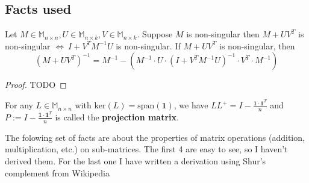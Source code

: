 \subsection{Facts used}

\begin{HXf}
 Let $ M \in \mathbb{M}_{n \times n} , U \in \mathbb{M}_{n \times k}, V \in \mathbb{M}_{n \times k}$. Suppose $M$ is non-singular then $M + UV^T$ is non-singular $\iff \ I + V^T M^{-1} U$ is non-singular. If $M + UV^T$ is non-singular, then 
 $$ (M + UV^T)^{-1} = M^{-1} - \left( M^{-1} \cdot U \cdot (I + V^TM^{-1}U)^{-1} \cdot V^T \cdot M^{-1}\right) $$
\end{HXf}

\begin{proof}
 TODO
\end{proof}

\begin{HXf}
 For any $L \in \mathbb{M}_{n \times n}$ with $\text{ker}(L) = \text{span}(\textbf{1})$, we have $LL^+ = I - \frac{\textbf{1} \cdot \textbf{1}^T}{n}$ and $P := I - \frac{\textbf{1} \cdot \textbf{1}^T}{n}$ is called the \textbf{projection matrix}. 
\end{HXf}

The folowing set of facts are about the properties of matrix operations (addition, multiplication, etc.) on sub-matrices. The first 4 are easy to see, so I haven't derived them. For the last one I have written a derivation using Shur's complement from Wikipedia

